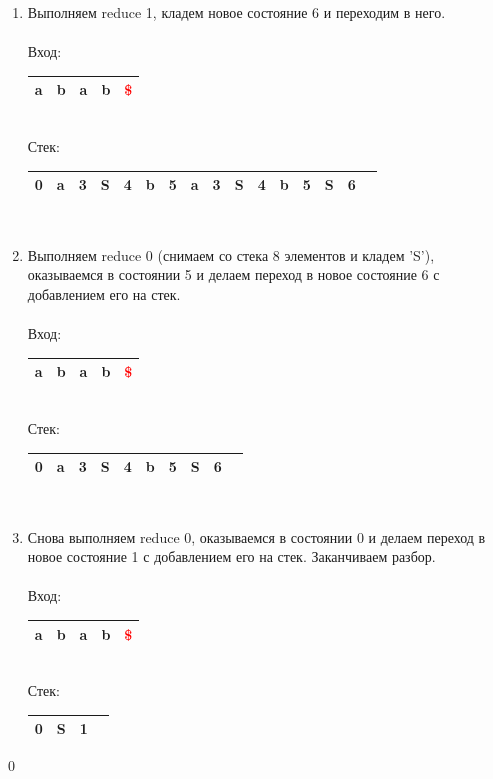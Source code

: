 \begin{example}
\begin{enumerate}
\begin{tabular}[c]{ |c|c|c|c|c|c|c|c|c|c|c|c|c|c }
\end{tabular}
\\
\item Выполняем reduce 1, кладем новое состояние 6 и переходим в него. \\ \\
Вход: \,
\begin{tabular}[c]{ |c|c|c|c|c| } 
    \hline a & b & a & b & \textcolor{red}{\$} \\ \hline
\end{tabular} \\
Стек: \,
\begin{tabular}[c]{ |c|c|c|c|c|c|c|c|c|c|c|c|c|c|c|c } 
    \hline 0 & a & 3 & S & 4 & b & 5 & a & 3 & S & 4 & b & 5 & S & 6 & \\ \hline
\end{tabular}
\\
\item Выполняем reduce 0 (снимаем со стека 8 элементов и кладем 'S'), оказываемся в состоянии 5 и делаем переход в новое состояние 6 с добавлением его на стек. \\ \\
Вход: \,
\begin{tabular}[c]{ |c|c|c|c|c| } 
    \hline a & b & a & b & \textcolor{red}{\$} \\ \hline
\end{tabular}\\
Стек: \,
\begin{tabular}[c]{ |c|c|c|c|c|c|c|c|c|c } 
    \hline 0 & a & 3 & S & 4 & b & 5 & S & 6 & \\ \hline
\end{tabular}
\\
\item Снова выполняем reduce 0, оказываемся в состоянии 0 и делаем переход в новое состояние 1 с добавлением его на стек. Заканчиваем разбор. \\ \\
Вход: \,
\begin{tabular}[c]{ |c|c|c|c|c| } 
    \hline a & b & a & b & \textcolor{red}{\$} \\ \hline
\end{tabular} \\
Стек: \,
\begin{tabular}[c]{ |c|c|c|c } 
    \hline 0 & S & 1 & \\ \hline
\end{tabular}
\end{enumerate}
\qed
\end{example}

